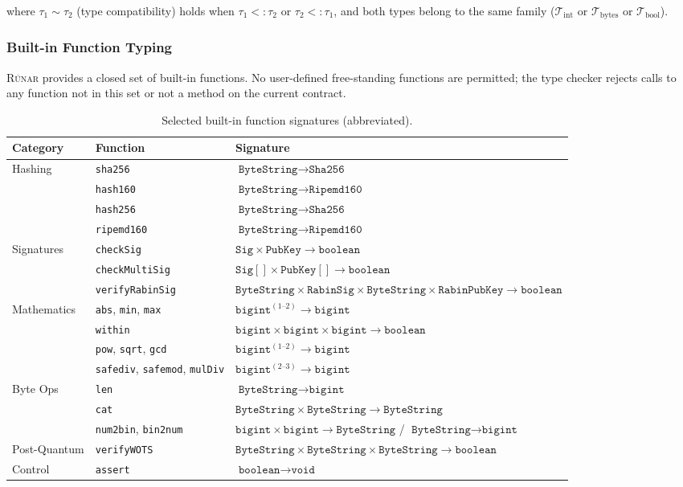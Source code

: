 \documentclass[11pt,a4paper]{article}
\newcommand{\runar}{\textsc{Rúnar}}
\newcommand{\bs}{\texttt{ByteString}}
\newcommand{\bigintty}{\texttt{bigint}}
\newcommand{\boolty}{\texttt{boolean}}
\newcommand{\voidty}{\texttt{void}}
\newcommand{\subtype}{\mathrel{<:}}
\begin{document}
where $\tau_1 \sim \tau_2$ (type compatibility) holds when $\tau_1 \subtype \tau_2$ or $\tau_2 \subtype \tau_1$, and both types belong to the same family ($\mathcal{T}_{\mathrm{int}}$ or $\mathcal{T}_{\mathrm{bytes}}$ or $\mathcal{T}_{\mathrm{bool}}$).

\subsubsection{Built-in Function Typing}

\runar{} provides a closed set of built-in functions. No user-defined
free-standing functions are permitted; the type checker rejects calls to any
function not in this set or not a method on the current contract.

\begin{table}[h]
\centering
\small
\begin{tabularx}{\textwidth}{@{}llX@{}}
\toprule
\textbf{Category} & \textbf{Function} & \textbf{Signature} \\
\midrule
\multirow{4}{*}{Hashing}
  & \texttt{sha256} & $\bs \to \texttt{Sha256}$ \\
  & \texttt{hash160} & $\bs \to \texttt{Ripemd160}$ \\
  & \texttt{hash256} & $\bs \to \texttt{Sha256}$ \\
  & \texttt{ripemd160} & $\bs \to \texttt{Ripemd160}$ \\
\midrule
\multirow{3}{*}{Signatures}
  & \texttt{checkSig} & $\texttt{Sig} \times \texttt{PubKey} \to \boolty$ \\
  & \texttt{checkMultiSig} & $\texttt{Sig}[] \times \texttt{PubKey}[] \to \boolty$ \\
  & \texttt{verifyRabinSig} & $\bs \times \texttt{RabinSig} \times \bs \times \texttt{RabinPubKey} \to \boolty$ \\
\midrule
\multirow{4}{*}{Mathematics}
  & \texttt{abs}, \texttt{min}, \texttt{max} & $\bigintty^{(1\text{--}2)} \to \bigintty$ \\
  & \texttt{within} & $\bigintty \times \bigintty \times \bigintty \to \boolty$ \\
  & \texttt{pow}, \texttt{sqrt}, \texttt{gcd} & $\bigintty^{(1\text{--}2)} \to \bigintty$ \\
  & \texttt{safediv}, \texttt{safemod}, \texttt{mulDiv} & $\bigintty^{(2\text{--}3)} \to \bigintty$ \\
\midrule
\multirow{3}{*}{Byte Ops}
  & \texttt{len} & $\bs \to \bigintty$ \\
  & \texttt{cat} & $\bs \times \bs \to \bs$ \\
  & \texttt{num2bin}, \texttt{bin2num} & $\bigintty \times \bigintty \to \bs$ / $\bs \to \bigintty$ \\
\midrule
Post-Quantum
  & \texttt{verifyWOTS} & $\bs \times \bs \times \bs \to \boolty$ \\
\midrule
Control
  & \texttt{assert} & $\boolty \to \voidty$ \\
\bottomrule
\end{tabularx}
\caption{Selected built-in function signatures (abbreviated).}
\label{tab:builtins}
\end{table}
\end{document}
